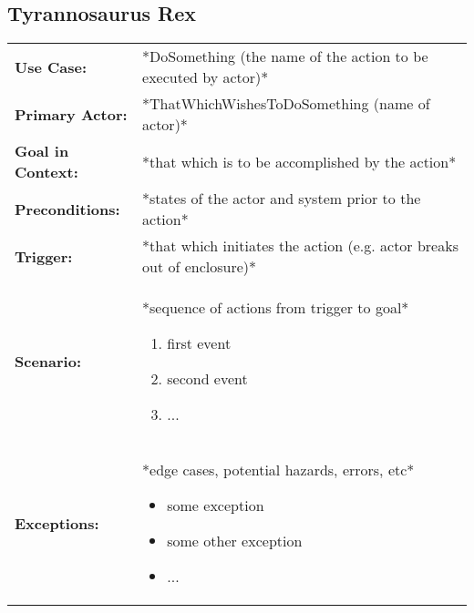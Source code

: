 \documentclass[12pt]{article}
\begin{document}
    
    

    \subsection{Tyrannosaurus Rex}
    \begin{table}[H]
    \begin{tabular}{lp{9.9cm}}
        \hline
        \textbf{Use Case:}                     & *DoSomething (the name of the action to be executed by actor)* \\

        \textbf{Primary Actor:}                & *ThatWhichWishesToDoSomething (name of actor)*\\

        \textbf{Goal in Context:}              & *that which is to be accomplished by the action* \\

        \textbf{Preconditions:}                & *states of the actor and system prior to the action* \\

        \textbf{Trigger:}                      & *that which initiates the action (e.g. actor breaks out of enclosure)*\\

        \textbf{Scenario:}                     & *sequence of actions from trigger to goal*
                                                 \begin{enumerate}
                                                     \item first event
                                                     \item second event
                                                     \item ...
                                                 \end{enumerate} \\

        \textbf{Exceptions:}                   & *edge cases, potential hazards, errors, etc*
                                                 \begin{itemize}
                                                     \item[] some exception
                                                     \item[] some other exception
                                                     \item[] ...
                                                 \end{itemize}\\


\end{tabular}
\end{table}
\end{document}
